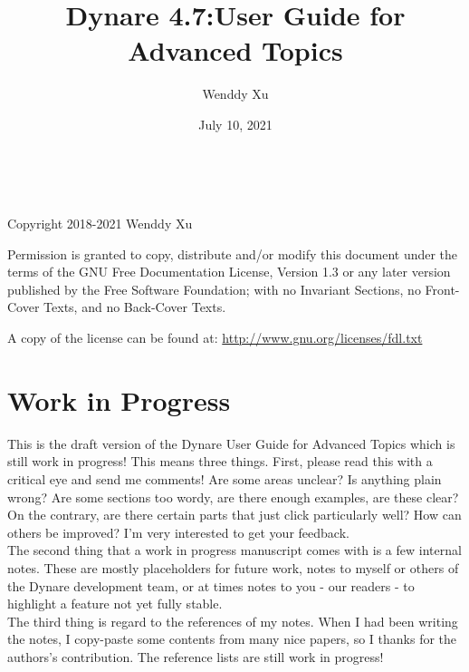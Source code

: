 \documentclass[cn,10pt,math=newtx,citestyle=gb7714-2015,bibstyle=gb7714-2015]{elegantbook}
\title{Dynare 4.7:User Guide for Advanced Topics}
\author{Wenddy Xu}
\institute{AHU/CIMERS/NEEL, China; SFU, Canada}
\date{July 10, 2021}
\begin{document}
	
	\maketitle
	\frontmatter
	
	\thispagestyle{empty}
	
	\newpage
	
	~\vfill
	
	Copyright  2018-2021 Wenddy Xu
	
	
	\bigskip
	
	Permission is granted to copy, distribute and/or modify this document under the terms of the GNU Free Documentation License, Version 1.3 or any later version published by the Free Software Foundation; with no Invariant Sections, no Front-Cover Texts, and no Back-Cover Texts.
	
	\bigskip
	
	A copy of the license can be found at: \url{http://www.gnu.org/licenses/fdl.txt}
	
	\vfill
	
	\newpage
	
	\chapter*{Work in Progress}
	
	
	
	This is the draft version of the Dynare User Guide for Advanced Topics which is still work in progress! This means three things. First, please read this with a critical eye and send me comments! Are some areas unclear? Is anything plain wrong? Are some sections too wordy, are there enough examples, are these clear? On the contrary, are there certain parts that just click particularly well? How can others be improved? I'm very interested to get your feedback. \\
	
	The second thing that a work in progress manuscript comes with is a few internal notes. These are mostly placeholders for future work, notes to myself or others of the Dynare development team, or at times notes to you - our readers - to highlight a feature not yet fully stable. \\
	
	The third thing is regard to the references of my notes. When I had been writing the notes, I copy-paste some contents from many nice papers, so I thanks for the authors's contribution. The reference lists are still work in progress!
	
\end{document}

